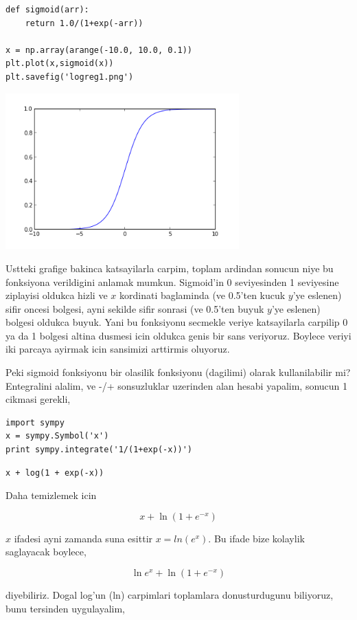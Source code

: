 \documentclass[12pt,fleqn]{article}\usepackage{../common}
\begin{document}
\begin{verbatim}
def sigmoid(arr):
    return 1.0/(1+exp(-arr))

x = np.array(arange(-10.0, 10.0, 0.1))
plt.plot(x,sigmoid(x))
plt.savefig('logreg1.png')
\end{verbatim}

\includegraphics[height=6cm]{logreg1.png}

Ustteki grafige bakinca katsayilarla carpim, toplam ardindan sonucun
niye bu fonksiyona verildigini anlamak mumkun. Sigmoid'in 0
seviyesinden 1 seviyesine ziplayisi oldukca hizli ve $x$ kordinati
baglaminda (ve 0.5'ten kucuk $y$'ye eslenen) sifir oncesi bolgesi,
ayni sekilde sifir sonrasi (ve 0.5'ten buyuk $y$'ye eslenen) bolgesi
oldukca buyuk. Yani bu fonksiyonu secmekle veriye katsayilarla
carpilip 0 ya da 1 bolgesi altina dusmesi icin oldukca genis bir sans
veriyoruz.  Boylece veriyi iki parcaya ayirmak icin sansimizi
arttirmis oluyoruz.


Peki sigmoid fonksiyonu bir olasilik fonksiyonu (dagilimi) olarak
kullanilabilir mi?  Entegralini alalim, ve -/+ sonsuzluklar uzerinden
alan hesabi yapalim, sonucun 1 cikmasi gerekli,

\begin{verbatim}
import sympy
x = sympy.Symbol('x')
print sympy.integrate('1/(1+exp(-x))')
\end{verbatim}

\begin{verbatim}
x + log(1 + exp(-x))
\end{verbatim}

Daha temizlemek icin

$$ x + \ln(1 + e^{-x}) $$

$x$ ifadesi ayni zamanda suna esittir $x=ln( e^{x} )$. Bu ifade bize
kolaylik saglayacak boylece,

$$ \ln e^{x} + \ln(1+e^{-x})  $$

diyebiliriz. Dogal log'un (ln) carpimlari toplamlara donusturdugunu
biliyoruz, bunu tersinden uygulayalim,
\end{document}
